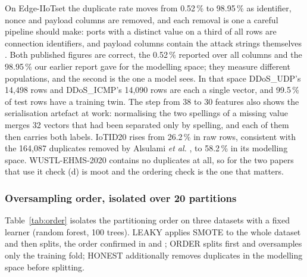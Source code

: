 On Edge-IIoTset the duplicate rate moves from 0.52\,\% to 98.95\,\% as identifier, nonce and payload columns are removed, and each removal is one a careful pipeline should make: ports with a distinct value on a third of all rows are connection identifiers, and payload columns contain the attack strings themselves \cite{galal2026}. Both published figures are correct, the 0.52\,\% reported over all columns \cite{galal2026} and the 98.95\,\% our earlier report gave for the modelling space; they measure different populations, and the second is the one a model sees. In that space DDoS\_UDP's 14,498 rows and DDoS\_ICMP's 14,090 rows are each a single vector, and 99.5\,\% of test rows have a training twin. The step from 38 to 30 features also shows the serialisation artefact at work: normalising the two spellings of a missing value merges 32 vectors that had been separated only by spelling, and each of them then carries both labels. IoTID20 rises from 26.2\,\% in raw rows, consistent with the 164,087 duplicates removed by Alsulami \textit{et al.} \cite{alsulami2022}, to 58.2\,\% in its modelling space. WUSTL-EHMS-2020 contains no duplicates at all, so for the two papers that use it check (d) is moot and the ordering check is the one that matters.

\subsubsection{Oversampling order, isolated over 20 partitions}
Table~\ref{tab:order} isolates the partitioning order on three datasets with a fixed learner (random forest, 100 trees). LEAKY applies SMOTE \cite{chawla2002} to the whole dataset and then splits, the order confirmed in \cite{berguiga2025} and \cite{hosain2025}; ORDER splits first and oversamples only the training fold; HONEST additionally removes duplicates in the modelling space before splitting.

